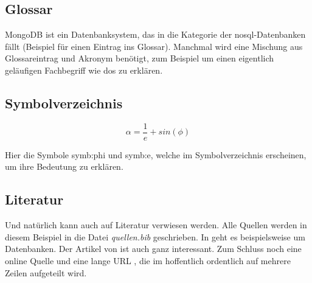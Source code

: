 \subsection{Glossar}

MongoDB ist ein Datenbanksystem, das in die Kategorie der \gls{nosql}-Datenbanken fällt (Beispiel für einen Eintrag ins Glossar).
Manchmal wird eine Mischung aus Glossareintrag und Akronym benötigt, zum Beispiel um einen eigentlich geläufigen Fachbegriff wie \gls{dos} zu erklären.

\subsection{Symbolverzeichnis}

\begin{equation}
  \alpha = \frac{1}{e} + sin(\phi)
\end{equation}

Hier die Symbole \gls{symb:phi} und \gls{symb:e}, welche im Symbolverzeichnis erscheinen, um ihre Bedeutung zu erklären.

\subsection{Literatur}

Und natürlich kann auch auf Literatur verwiesen werden.
Alle Quellen werden in diesem Beispiel in die Datei \textit{quellen.bib} geschrieben.
In  \cite{unterstein12} geht es beispielsweise um Datenbanken.
Der Artikel von \citeauthor{goldberg91} \cite{goldberg91} ist auch ganz interessant.
Zum Schluss noch eine online Quelle \cite{wave} und eine lange URL \cite{long}, die im  hoffentlich ordentlich auf mehrere Zeilen aufgeteilt wird.


